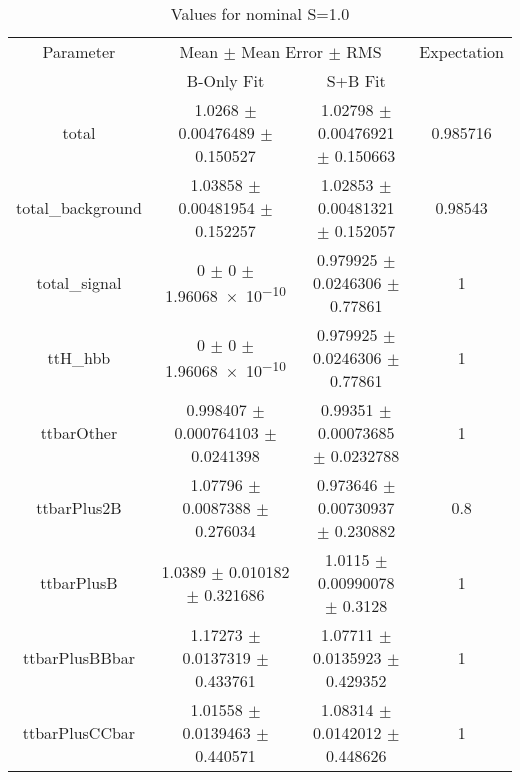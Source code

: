 \begin{table}
\centering
\caption{Values for nominal S=1.0}
\begin{tabular}{cccc}
\toprule
Parameter & \multicolumn{2}{c}{Mean $\pm$ Mean Error $\pm$ RMS} & Expectation\\
 & B-Only Fit & S+B Fit & \\
\midrule
total & \num{1.0268} $\pm$ \num{0.00476489} $\pm$ \num{0.150527} & \num{1.02798} $\pm$ \num{0.00476921} $\pm$ \num{0.150663} & \num{0.985716}\\
total\_background & \num{1.03858} $\pm$ \num{0.00481954} $\pm$ \num{0.152257} & \num{1.02853} $\pm$ \num{0.00481321} $\pm$ \num{0.152057} & \num{0.98543}\\
total\_signal & \num{0} $\pm$ \num{0} $\pm$ \num{1.96068e-10} & \num{0.979925} $\pm$ \num{0.0246306} $\pm$ \num{0.77861} & \num{1}\\
ttH\_hbb & \num{0} $\pm$ \num{0} $\pm$ \num{1.96068e-10} & \num{0.979925} $\pm$ \num{0.0246306} $\pm$ \num{0.77861} & \num{1}\\
ttbarOther & \num{0.998407} $\pm$ \num{0.000764103} $\pm$ \num{0.0241398} & \num{0.99351} $\pm$ \num{0.00073685} $\pm$ \num{0.0232788} & \num{1}\\
ttbarPlus2B & \num{1.07796} $\pm$ \num{0.0087388} $\pm$ \num{0.276034} & \num{0.973646} $\pm$ \num{0.00730937} $\pm$ \num{0.230882} & \num{0.8}\\
ttbarPlusB & \num{1.0389} $\pm$ \num{0.010182} $\pm$ \num{0.321686} & \num{1.0115} $\pm$ \num{0.00990078} $\pm$ \num{0.3128} & \num{1}\\
ttbarPlusBBbar & \num{1.17273} $\pm$ \num{0.0137319} $\pm$ \num{0.433761} & \num{1.07711} $\pm$ \num{0.0135923} $\pm$ \num{0.429352} & \num{1}\\
ttbarPlusCCbar & \num{1.01558} $\pm$ \num{0.0139463} $\pm$ \num{0.440571} & \num{1.08314} $\pm$ \num{0.0142012} $\pm$ \num{0.448626} & \num{1}\\
\bottomrule
\end{tabular}
\end{table}